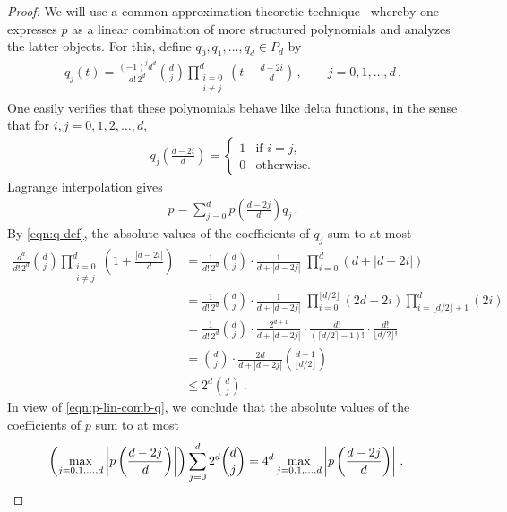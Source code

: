 \documentclass[10pt]{article}
\theoremstyle{definition}
\numberwithin{equation}{section}
\newcommand{\PARENS}[1]{\left(#1\right)}
\newcommand{\ABS}[1]{\left\lvert #1 \right\rvert}
\begin{document}
\begin{proof}
We will use a common approximation-theoretic 
technique~\cite{cheney-book,rivlin-book}
whereby one expresses $p$ as a linear
combination of more structured polynomials
and analyzes the latter objects. 
For this, define $q_0,q_1,\dots,q_d\in P_d$ by 
\begin{align}
 q_j(t) = \frac{(-1)^j d^d}{d!\,2^d}{d\choose j}
\prod_{\substack{i=0\\i\ne j}}^d \PARENS{t - \frac{d-2i}d}\,,
\qquad j=0,1,\dots,d\,.
\label{eqn:q-def}
\end{align}
One easily verifies that these polynomials behave like
delta functions, in the sense that for 
$i,j=0,1,2,\dots,d,$ 
\begin{align*}
q_j\PARENS{\frac {d-2i}d} = \begin{cases}
1 &\text{if $i=j,$}\\
0 &\text{otherwise.}
\end{cases}
\end{align*}
Lagrange interpolation gives
\begin{align}
p=\sum_{j=0}^d p\PARENS{\frac {d-2j}d}q_j\,.
\label{eqn:p-lin-comb-q}
\end{align}
By \eqref{eqn:q-def}, the absolute values of the
coefficients of $q_j$ sum to at most
\begin{align*}
\frac{d^d}{d!\,2^d}{d\choose j}\prod_{\substack{i=0\\i\ne
j}}^d\left(1+\frac {|d-2i|}d\right)&=
\frac{1}{d!\,2^d}{d\choose j}\cdot \frac1{d+|d-2j|}\;
\prod_{i=0}^d(d+|d-2i|)\\
&=
\frac{1}{d!\,2^d}{d\choose j}\cdot \frac1{d+|d-2j|}\;
\prod_{i=0}^{\lfloor d/2\rfloor} (2d-2i) 
\prod_{i=\lfloor d/2\rfloor+1}^d (2i) \\
&=
\frac{1}{d!\,2^d}{d\choose j}\cdot \frac{2^{d+1}}{d+|d-2j|}
\cdot \frac{d!}{\left(\lceil d/2\rceil-1\right)!} 
\cdot \frac{d!}{\lfloor d/2\rfloor!} \\
&=
{d\choose j}\cdot \frac{2d}{d+|d-2j|} {d-1 \choose \lfloor d/2\rfloor} \\
&\leq 2^d {d\choose j}\,. \end{align*}
In view of \eqref{eqn:p-lin-comb-q}, we conclude that
the absolute values of the coefficients of
$p$ sum to at most
\begin{align*}
\PARENS{\max_{j=0,1,\dots,d}\ABS{p\PARENS{\frac
{d-2j}d}}}
\sum_{j=0}^d 2^d{d\choose j} =4^d 
\max_{j=0,1,\dots,d}\ABS{p\PARENS{\frac {d-2j}d}}\,.& \qedhere
\end{align*}
\end{proof}
\end{document}
